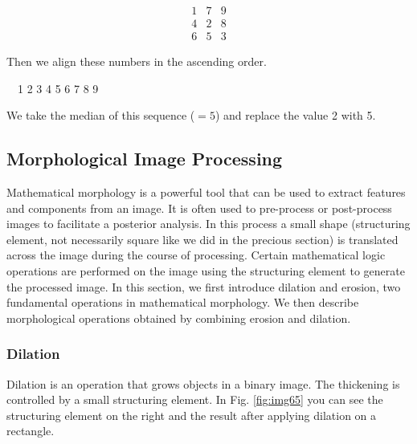 \[
 \begin{matrix}
  1 & 7 & 9 \\
  4 & 2 & 8 \\
  6 & 5 & 3
 \end{matrix}
\]

Then we align these numbers in the ascending order. 

\ \ 1 2 3 4 5 6 7 8 9

We take the median of this sequence ($=5$) and replace the value 2 with
5.
\subsection{Morphological Image Processing}

Mathematical morphology is a powerful tool that can be used to extract
features and components from an image. It is often used to pre-process
or post-process images to facilitate a posterior analysis. In this process a
small shape (structuring element, not necessarily square like we did in
the precious section) is translated across the image during the course
of processing. Certain mathematical logic operations are performed on
the image using the structuring element to generate the processed
image.
In this section, we first introduce dilation and erosion, two
fundamental operations in mathematical morphology. We then describe
morphological operations obtained by combining erosion and dilation. 
\subsubsection{Dilation}
Dilation is an operation that grows objects in a binary image. The
thickening is controlled by a small structuring element. In Fig. \ref{fig:img65} 
you can see the structuring element on the right and
the result after applying dilation on a rectangle.

